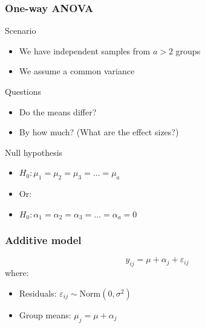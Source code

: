 \documentclass[color=usenames,dvipsnames]{beamer}\usepackage[]{graphicx}\usepackage[]{color}
\begin{document}
\begin{frame}
  \frametitle{One-way ANOVA}
  {\Large Scenario}
  \begin{itemize}
    \item We have independent samples from $a>2$ groups
    \item We assume a common variance
  \end{itemize}
  \pause
  \vfill
  {\Large Questions}
  \begin{itemize}
    \item Do the means differ?
    \item By how much? (What are the effect sizes?)
  \end{itemize}
  \pause
  \vfill
  {\Large Null hypothesis}
  \begin{itemize}
    \item $H_0: \mu_1 = \mu_2 = \mu_3 = \ldots = \mu_a$
    \item Or:
    \item $H_0: \alpha_1 = \alpha_2 = \alpha_3 = \ldots = \alpha_a = 0$
  \end{itemize}
\end{frame}





\begin{frame}
  \frametitle{Additive model}
  \Large
  \[
    y_{ij} = \mu + \alpha_j + \varepsilon_{ij}
  \]
  \large
  \vfill
  where:
  \begin{itemize}
    \item Residuals: $\varepsilon_{ij} \sim \mathrm{Norm}(0, \sigma^2)$
    \item Group means: $\mu_j = \mu + \alpha_j$
  \end{itemize}
\end{frame}




\end{document}
